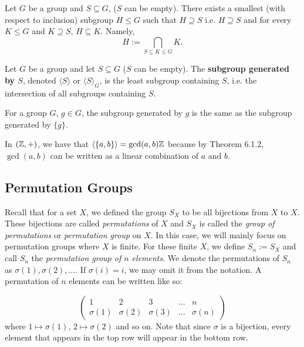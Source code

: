\begin{remark}
   Let $G$ be a group and $S \subseteq G$, ($S$ can be empty). There exists a smallest (with respect to inclusion) subgroup $H \leq G$ such that $H \supseteq S$ i.e. $H \supseteq S$ and for every $K \leq G$ and $K \supseteq S$, $H \subseteq K$. Namely,
   \[ H := \bigcap_{S \subseteq K \leq G} K. \]
\end{remark}

\begin{defbox}
   Let $G$ be a group and let $S \subseteq G$ ($S$ can be empty). The \textbf{subgroup generated by $S$}, denoted $\langle S \rangle$ or $\langle S \rangle_G$, is the least subgroup containing $S$, i.e. the intersection of all subgroups containing $S$. 
\end{defbox}

\begin{example}
   For a group $G$, $g \in G$, the subgroup generated by $g$ is the same as the subgroup generated by $\{g\}$. 
\end{example}
\begin{example}
   In $(\mathbb{Z}, +)$, we have that $\langle \{a,b\} \rangle = \gcd(a,b)\mathbb{Z}$ because by Theorem 6.1.2, $\gcd(a,b)$ can be written as a linear combination of $a$ and $b$. 
\end{example}

\subsection{Permutation Groups}

Recall that for a set $X$, we defined the group $S_X$ to be all bijections from $X$ to $X$. These bijections are called \textit{permutations} of $X$ and $S_X$ is called the \textit{group of permutations} or \textit{permutation group} on $X$. In this case, we will mainly focus on permutation groups where $X$ is finite. For these finite $X$, we define $S_n := S_X$ and call $S_n$ the \textit{permutation group of $n$ elements}. We denote the permutations of $S_n$ as $\sigma(1), \sigma(2), \dots$. If $\sigma(i) = i$, we may omit it from the notation. A permutation of $n$ elements can be written like so:

\[ \begin{pmatrix}
1 & 2 & 3 & \dots & n \\
\sigma(1) & \sigma(2) & \sigma(3) & \dots & \sigma(n)
\end{pmatrix} 
\]
where $1 \mapsto \sigma(1)$, $2 \mapsto \sigma(2)$ and so on. Note that since $\sigma$ is a bijection, every element that appears in the top row will appear in the bottom row.

